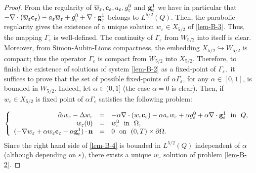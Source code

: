 \documentclass[11pt,reqno]{amsart}%
\numberwithin{equation}{section}
\begin{document}
{\begin{proof}
 From the regularity of $\overline{w}_\varepsilon,{\bf c}_\varepsilon,a_\varepsilon,g^0_\varepsilon$ and ${\bf g}^1_\varepsilon$ we have in particular that $-\nabla\cdot(\overline{w}_\varepsilon{\bf c}_\varepsilon)-a_\varepsilon \overline{w}_\varepsilon +g^0_\varepsilon+\nabla\cdot{\bf g}^1_\varepsilon$ belongs to $L^{5/2}(Q)$. Then, the parabolic regularity gives the existence of a unique solution $w_\varepsilon\in X_{5/2}$ of \eqref{lem-B-3}. Thus, the mapping $\Gamma_\varepsilon$ is well-defined. The continuity of $\Gamma_\varepsilon$ from $W_{5/2}$ into itself is clear. Moreover, from Simon-Aubin-Lions compactness,  the embedding $X_{5/2}\hookrightarrow W_{5/2}$ is compact; thus the operator $\Gamma_\varepsilon$ is compact from $W_{5/2}$ into $X_{5/2}$.  Therefore, to finish the existence of solutions of system \eqref{lem-B-2} as a fixed-point of $\Gamma_\varepsilon,$ it suffices to prove that the set of possible fixed-points of $\alpha\Gamma_\varepsilon$, for any $\alpha\in[0,1]$, is bounded in $W_{5/2}$. Indeed, let $\alpha\in(0,1]$ (the case $\alpha=0$ is clear). Then, if $w_\varepsilon\in X_{5/2}$ is fixed point of $\alpha\Gamma_\varepsilon$ satisfies the following problem:
 
  \begin{equation}\label{lem-B-4}
 \left\{
 \begin{array}{rcl}
 \partial_t w_\varepsilon-\Delta w_\varepsilon&=&-\alpha\nabla\cdot({w}_\varepsilon{\bf c}_\varepsilon)-\alpha a_{\varepsilon}{w}_\varepsilon +\alpha g^0_\varepsilon+\alpha\nabla\cdot{\bf g}^1_\varepsilon\ \mbox{ in }\ Q,\\
 w_\varepsilon(0)&=&w_\varepsilon^0\ \mbox{ in }\ \Omega,\\
(-\nabla w_\varepsilon+\alpha w_\varepsilon{\bf c}_\varepsilon- \alpha {\bf g}_\varepsilon^1)\cdot{\bf n}&=&0\ \mbox{ on }\ (0,T)\times\partial\Omega.
 \end{array}
 \right.
 \end{equation}
 Since the right hand side of \eqref{lem-B-4} is bounded in $L^{5/2}(Q)$ independent of $\alpha$ (although depending on  $\varepsilon$), there exists a unique $w_\varepsilon$ solution of problem  \eqref{lem-B-2}.
 

\end{proof}}
\end{document}
